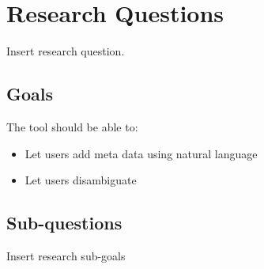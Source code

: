 
\section{Research Questions}
Insert research question.

\subsection{Goals}
The tool should be able to:
\begin{itemize}
	\item Let users add meta data using natural language
	\item Let users disambiguate
\end{itemize}

\subsection{Sub-questions}
Insert research sub-goals
